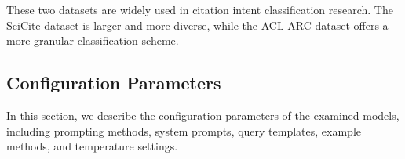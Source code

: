These two datasets are widely used in citation intent classification research. 
The SciCite dataset is larger and more diverse, while the ACL-ARC dataset offers a more granular classification scheme. 



\subsection{Configuration Parameters}
\label{sec:configuration-params}
In this section, we describe the configuration parameters of the examined models, including prompting methods, system prompts, query templates, example methods, and temperature settings. 




